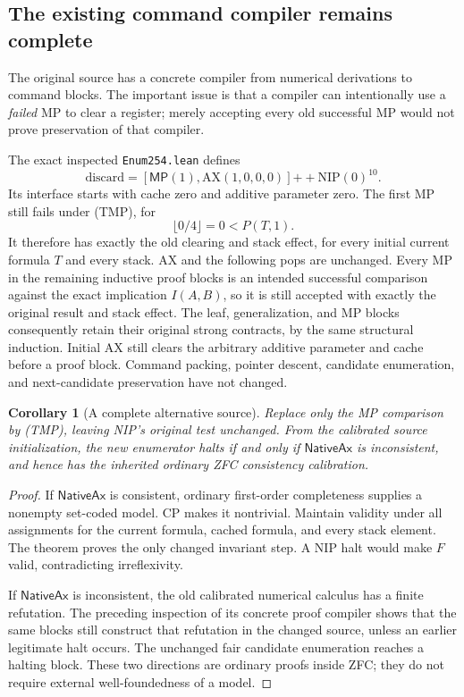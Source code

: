 \documentclass[11pt]{article}
\newtheorem{corollary}[theorem]{Corollary}
\newcommand{\Native}{\mathsf{NativeAx}}
\newcommand{\MP}{\mathsf{MP}}
\begin{document}
\subsection{The existing command compiler remains complete}

The original source has a concrete compiler from numerical derivations to
command blocks. The important issue is that a compiler can intentionally use
a \emph{failed} MP to clear a register; merely accepting every old successful
MP would not prove preservation of that compiler.

The exact inspected \texttt{Enum254.lean} defines
\[
 \mathrm{discard}=[\MP(1),\mathrm{AX}(1,0,0,0)]
                         \mathbin{+\!+}\mathrm{NIP}(0)^{10}.
\]
Its interface starts with cache zero and additive parameter zero. The first
MP still fails under (TMP), for
\[
 \lfloor0/4\rfloor=0<P(T,1).
\]
It therefore has exactly the old clearing and stack effect, for every initial
current formula \(T\) and every stack. AX and the following pops are unchanged.
Every MP in the remaining inductive proof blocks is an intended successful
comparison against the exact implication \(I(A,B)\), so it is still accepted
with exactly the original result and stack effect. The leaf, generalization,
and MP blocks consequently retain their original strong contracts, by the
same structural induction. Initial AX still clears the arbitrary additive
parameter and cache before a proof block. Command packing, pointer descent,
candidate enumeration, and next-candidate preservation have not changed.

\begin{corollary}[A complete alternative source]
Replace only the MP comparison by (TMP), leaving NIP's original test unchanged.
From the calibrated source initialization, the new enumerator halts if and
only if \(\Native\) is inconsistent, and hence has the inherited ordinary
ZFC consistency calibration.
\end{corollary}
\begin{proof}
If \(\Native\) is consistent, ordinary first-order completeness supplies a
nonempty set-coded model. CP makes it nontrivial. Maintain validity under all
assignments for the current formula, cached formula, and every stack element.
The theorem proves the only changed invariant step. A NIP halt would make
\(F\) valid, contradicting irreflexivity.

If \(\Native\) is inconsistent, the old calibrated numerical calculus has a
finite refutation. The preceding inspection of its concrete proof compiler
shows that the same blocks still construct that refutation in the changed
source, unless an earlier legitimate halt occurs. The unchanged fair candidate
enumeration reaches a halting block. These two directions are ordinary proofs
inside ZFC; they do not require external well-foundedness of a model.
\end{proof}
\end{document}
